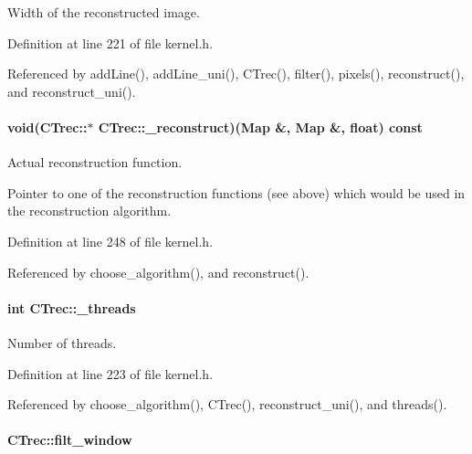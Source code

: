 Width of the reconstructed image. 



Definition at line 221 of file kernel.h.



Referenced by addLine(), addLine\_\-uni(), CTrec(), filter(), pixels(), reconstruct(), and reconstruct\_\-uni().

\hypertarget{classCTrec_a09c82f115c45c386250a68cd0d8d957b}{
\paragraph[{\_\-reconstruct}]{\setlength{\rightskip}{0pt plus 5cm}void(CTrec::$\ast$ {\bf CTrec::\_\-reconstruct})({\bf Map} \&, {\bf Map} \&, float) const }\hfill}
\label{classCTrec_a09c82f115c45c386250a68cd0d8d957b}


Actual reconstruction function. 

Pointer to one of the reconstruction functions (see above) which would be used in the reconstruction algorithm. 

Definition at line 248 of file kernel.h.



Referenced by choose\_\-algorithm(), and reconstruct().

\hypertarget{classCTrec_aff2191f8d346c015b4df15e05d3a0d31}{
\paragraph[{\_\-threads}]{\setlength{\rightskip}{0pt plus 5cm}int {\bf CTrec::\_\-threads}}\hfill}
\label{classCTrec_aff2191f8d346c015b4df15e05d3a0d31}


Number of threads. 



Definition at line 223 of file kernel.h.



Referenced by choose\_\-algorithm(), CTrec(), reconstruct\_\-uni(), and threads().

\hypertarget{classCTrec_a68ba6426b5de1fc98b63ff6c88d402f4}{
\paragraph[{filt\_\-window}]{ {\bf CTrec::filt\_\-window}}\hfill}
\label{classCTrec_a68ba6426b5de1fc98b63ff6c88d402f4}


